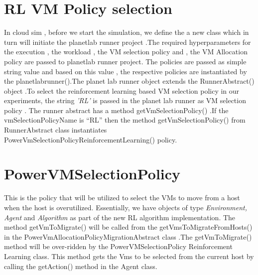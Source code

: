 \documentclass[a4paper,12pt]{Classes/RoboticsLaTeX}
\begin{document}
       \section{RL VM Policy selection }
       In cloud sim , before we start the simulation, we define the  a new class which in turn will initiate the planetlab runner project .The required hyperparameters for the execution , the workload , the VM selection policy and , the VM Allocation policy are passed to planetlab runner project. The policies are passed as simple string value and based on this value , the respective policies are instantiated by the planetlabrunner().The planet lab runner object extends the RunnerAbstract() object .To select the reinforcement learning based VM selection policy in our experiments, the string \textit{'RL’} is passed in the planet lab runner as VM selection policy . The runner abstract has a method getVmSelectionPolicy() .If the vmSelectionPolicyName is “RL” then the method getVmSelectionPolicy() from RunnerAbstract class instantiates  PowerVmSelectionPolicyReinforcementLearning() policy.

       \section{PowerVMSelectionPolicy} 
       This is the policy that will be utilized to select the VMs to move  from a host when the host is overutilized. Essentially, we have objects of type \textit{Environment, Agent} and \textit{Algorithm} as part of the new RL algorithm implementation. The method getVmToMigrate() will be called from the getVmsToMigrateFromHosts() in the PowerVmAllocationPolicyMigrationAbstract class .The getVmToMigrate()  method will be over-ridden by the PowerVMSelectionPolicy Reinforcement Learning class. This method gets the  Vms to be selected from the current host by calling the getAction() method in the Agent class.
\end{document}
